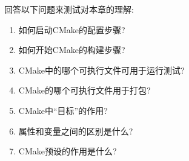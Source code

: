 
回答以下问题来测试对本章的理解:

\begin{enumerate}
\item 
如何启动CMake的配置步骤?

\item 
如何开始CMake的构建步骤?

\item 
CMake中的哪个可执行文件可用于运行测试?

\item 
CMake的哪个可执行文件用于打包?

\item 
CMake中“目标”的作用?

\item 
属性和变量之间的区别是什么?

\item 
CMake预设的作用是什么?
\end{enumerate}
